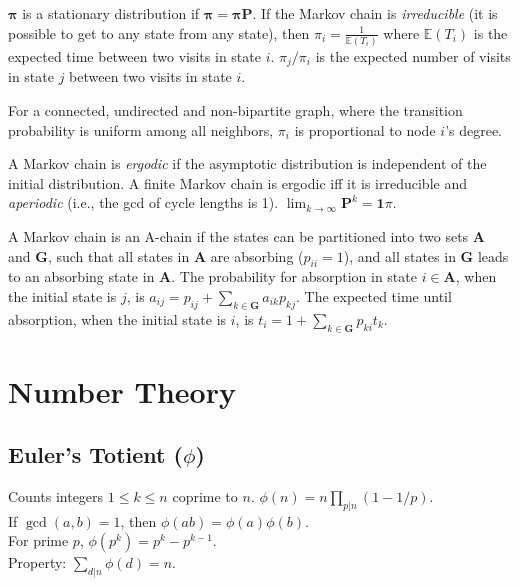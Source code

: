 $\mathbf{\pi}$ is a stationary distribution if $\mathbf{\pi} = \mathbf{\pi P}$.
If the Markov chain is \emph{irreducible} (it is possible to get to any state from any state),
then $\pi_i = \frac{1}{\mathbb{E}(T_i)}$ where $\mathbb{E}(T_i)$  is the expected time between two visits in state $i$.
$\pi_j/\pi_i$ is the expected number of visits in state $j$ between two visits in state $i$.

For a connected, undirected and non-bipartite graph, where the transition probability is uniform among all neighbors, $\pi_i$ is proportional to node $i$'s degree.

A Markov chain is \emph{ergodic} if the asymptotic distribution is independent of the initial distribution.
A finite Markov chain is ergodic iff it is irreducible and \emph{aperiodic} (i.e., the gcd of cycle lengths is 1).
$\lim_{k\rightarrow\infty}\mathbf{P}^k = \mathbf{1}\pi$.

A Markov chain is an A-chain if the states can be partitioned into two sets $\mathbf{A}$ and $\mathbf{G}$, such that all states in $\mathbf{A}$ are absorbing ($p_{ii}=1$), and all states in $\mathbf{G}$ leads to an absorbing state in $\mathbf{A}$.
The probability for absorption in state $i\in\mathbf{A}$, when the initial state is $j$, is $a_{ij} = p_{ij}+\sum_{k\in\mathbf{G}} a_{ik}p_{kj}$.
The expected time until absorption, when the initial state is $i$, is $t_i = 1+\sum_{k\in\mathbf{G}}p_{ki}t_k$.

\section{Number Theory}

\subsection{Euler's Totient ($\phi$)}
\raggedright
Counts integers $1 \le k \le n$ coprime to $n$.
$\phi(n) = n \prod_{p|n} (1 - 1/p)$. \\
If $\gcd(a,b)=1$, then $\phi(ab) = \phi(a)\phi(b)$. \\
For prime $p$, $\phi(p^k) = p^k - p^{k-1}$. \\
Property: $\sum_{d|n} \phi(d) = n$.

